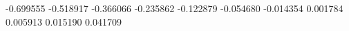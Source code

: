 -0.699555
-0.518917
-0.366066
-0.235862
-0.122879
-0.054680
-0.014354
0.001784
0.005913
0.015190
0.041709
